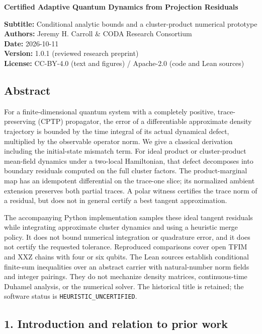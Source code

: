 \documentclass[
]{article}
\author{}
\date{}
\begin{document}
\begin{center}
{\LARGE\bfseries Certified Adaptive Quantum Dynamics from Projection Residuals \par}
\end{center}

\textbf{Subtitle:} Conditional analytic bounds and a cluster-product numerical prototype\\
\textbf{Authors:} Jeremy H. Carroll \& CODA Research Consortium\\
\textbf{Date:} 2026-10-11\\
\textbf{Version:} 1.0.1 (reviewed research preprint)\\
\textbf{License:} CC-BY-4.0 (text and figures) / Apache-2.0 (code and Lean sources)

\subsection{Abstract}\label{abstract}

For a finite-dimensional quantum system with a completely positive, trace-preserving (CPTP) propagator, the error of a differentiable approximate density trajectory is bounded by the time integral of its actual dynamical defect, multiplied by the observable operator norm. We give a classical derivation including the initial-state mismatch term. For ideal product or cluster-product mean-field dynamics under a two-local Hamiltonian, that defect decomposes into boundary residuals computed on the full cluster factors. The product-marginal map has an idempotent differential on the trace-one slice; its normalized ambient extension preserves both partial traces. A polar witness certifies the trace norm of a residual, but does not in general certify a best tangent approximation.

The accompanying Python implementation samples these ideal tangent residuals while integrating approximate cluster dynamics and using a heuristic merge policy. It does not bound numerical integration or quadrature error, and it does not certify the requested tolerance. Reproduced comparisons cover open TFIM and XXZ chains with four or six qubits. The Lean sources establish conditional finite-sum inequalities over an abstract carrier with natural-number norm fields and integer pairings. They do not mechanize density matrices, continuous-time Duhamel analysis, or the numerical solver. The historical title is retained; the software status is \texttt{HEURISTIC\_UNCERTIFIED}.

\subsection{1. Introduction and relation to prior work}\label{introduction-and-relation-to-prior-work}
\end{document}
